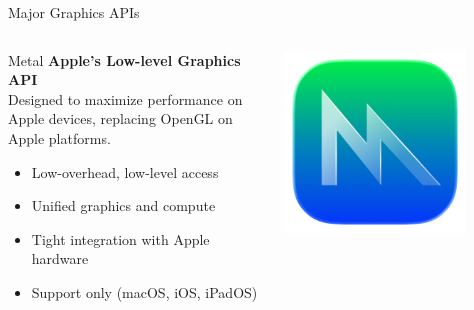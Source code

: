 \begin{frame}{Major Graphics APIs}
  \small
  \begin{columns}
    \begin{column}{0.7\textwidth}
      \begin{conceptbox}{Metal}
        \textbf{Apple's Low-level Graphics API} \\
        Designed to maximize performance on Apple devices, replacing OpenGL on Apple platforms.
        \begin{itemize}
          \item Low-overhead, low-level access
          \item Unified graphics and compute
          \item Tight integration with Apple hardware
          \item {} Support only (macOS, iOS, iPadOS)
        \end{itemize}
      \end{conceptbox}
    \end{column}
    \begin{column}{0.3\textwidth}
      \begin{center}
        \includegraphics[width=0.8\textwidth]{images/Metal_4.png}
      \end{center}
    \end{column}
  \end{columns}
\end{frame}

